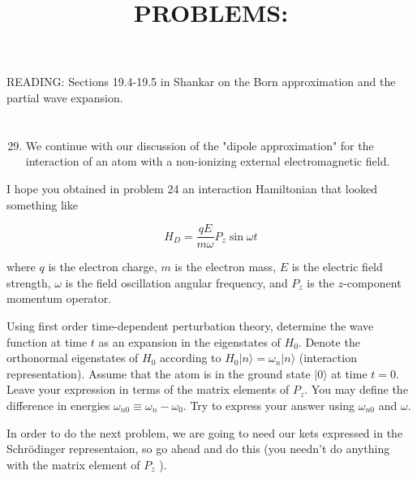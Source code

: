 \documentclass[12pt]{article}
\title{PROBLEMS: }
\author{}
\date{}
\begin{document}
\maketitle
READING: Sections 19.4-19.5 in Shankar on the Born approximation and the partial wave expansion.
\section{}
\begin{enumerate}
  \setcounter{enumi}{28}
  \item We continue with our discussion of the "dipole approximation" for the interaction of an atom with a non-ionizing external electromagnetic field.
\end{enumerate}

I hope you obtained in problem 24 an interaction Hamiltonian that looked something like


\begin{equation*}
H_{D}=\frac{q E}{m \omega} P_{z} \sin \omega t \tag{1}
\end{equation*}


where $q$ is the electron charge, $m$ is the electron mass, $E$ is the electric field strength, $\omega$ is the field oscillation angular frequency, and $P_{z}$ is the $z$-component momentum operator.

Using first order time-dependent perturbation theory, determine the wave function at time $t$ as an expansion in the eigenstates of $H_{0}$. Denote the orthonormal eigenstates of $H_{0}$ according to $H_{0}|n\rangle=\omega_{n}|n\rangle$ (interaction representation). Assume that the atom is in the ground state $|0\rangle$ at time $t=0$. Leave your expression in terms of the matrix elements of $P_{z}$. You may define the difference in energies $\omega_{n 0} \equiv \omega_{n}-\omega_{0}$. Try to express your answer using $\omega_{n 0}$ and $\omega$.

In order to do the next problem, we are going to need our kets expressed in the Schrödinger representaion, so go ahead and do this (you needn't do anything with the matrix element of $P_{z}$ ).
\end{document}
